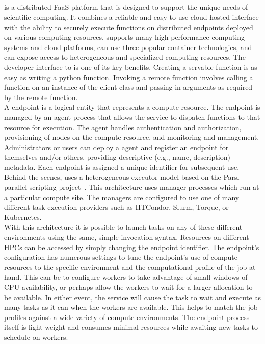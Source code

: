 \subsection{\funcX{}}\label{subsec:funcX}
\funcX{} is a distributed FaaS platform that is designed to support the unique needs of scientific computing. It combines a reliable and easy-to-use cloud-hosted interface with the ability to securely execute functions on distributed endpoints deployed on various computing resources. \funcX{} supports many high performance computing systems and cloud platforms, can use three popular container technologies, and can expose access to heterogeneous and specialized computing resources. The developer interface to \funcX{} is one of its key benefits. Creating a servable function is as easy as writing a python function. Invoking a remote function involves calling a function on an instance of the \funcX{} client class and passing in arguments as required by the remote function.\\

A \funcX{} endpoint is a logical entity that represents a compute resource. The endpoint is managed by an agent process that allows the \funcX{} service to dispatch functions to that resource for execution. The agent handles authentication and authorization, provisioning of nodes on the compute resource, and monitoring and management. Administrators or users can deploy a \funcX{} agent and register an endpoint for themselves and/or others, providing descriptive (e.g., name, description) metadata. Each endpoint is assigned a unique identifier for subsequent use.
\\

Behind the scenes, \funcX{} uses a heterogeneous executor model based on the Parsl parallel scripting project~\cite{Parsl_paper}.  This architecture uses manager processes which run at a particular compute site. The managers are configured to use one of many different task execution providers such as HTCondor, Slurm, Torque, or Kubernetes.\\

With this architecture it is possible to launch tasks on any of these different environments using the same, simple invocation syntax. Resources on different HPCs can be accessed by simply changing the endpoint identifier. The endpoint's configuration has numerous settings to tune the endpoint's use of compute resources to the specific environment and the computational profile of the job at hand. This can be to configure workers to take advantage of small windows of CPU availability, or perhaps allow the workers to wait for a larger allocation to be available. In either event, the \funcX{} service will cause the task to wait and execute as many tasks as it can when the workers are available.  This helps to match the job profiles against a wide variety of compute environments. The endpoint process itself is light weight and consumes minimal resources while awaiting new tasks to schedule on workers.\\

